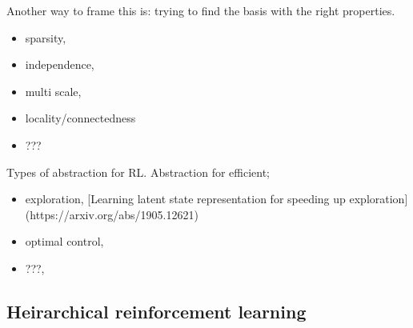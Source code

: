 Another way to frame this is: trying to find the basis with the right
properties.

\begin{itemize}
\tightlist
\item
  sparsity,
\item
  independence,
\item
  multi scale,
\item
  locality/connectedness
\item
  ???
\end{itemize}


Types of abstraction for RL. Abstraction for efficient;

\begin{itemize}
\tightlist
\item
  exploration, [Learning latent state representation for speeding up exploration](https://arxiv.org/abs/1905.12621)
\item
  optimal control,
\item
  ???,
\end{itemize}


\subsection{Heirarchical reinforcement learning}
